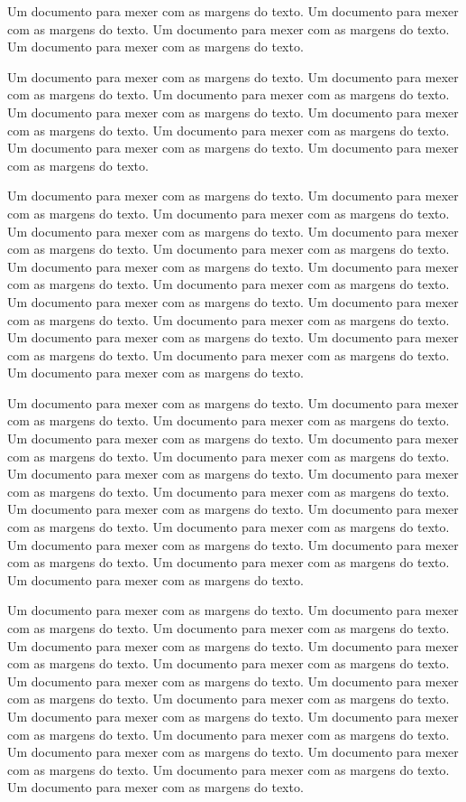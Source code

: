 \documentclass[12pt,article,a4paper,oneside]{memoir}
\begin{document}
\bigskip %

Um documento para mexer com as margens do texto. Um documento para mexer com as margens do texto. Um documento para mexer com as margens do texto. Um documento para mexer com as margens do texto. 

Um documento para mexer com as margens do texto. Um documento para mexer com as margens do texto. Um documento para mexer com as margens do texto. Um documento para mexer com as margens do texto. Um documento para mexer com as margens do texto. Um documento para mexer com as margens do texto. Um documento para mexer com as margens do texto. Um documento para mexer com as margens do texto. 

Um documento para mexer com as margens do texto. Um documento para mexer com as margens do texto. Um documento para mexer com as margens do texto. Um documento para mexer com as margens do texto. Um documento para mexer com as margens do texto. Um documento para mexer com as margens do texto. Um documento para mexer com as margens do texto. Um documento para mexer com as margens do texto. Um documento para mexer com as margens do texto. Um documento para mexer com as margens do texto. Um documento para mexer com as margens do texto. Um documento para mexer com as margens do texto. Um documento para mexer com as margens do texto. Um documento para mexer com as margens do texto. Um documento para mexer com as margens do texto. Um documento para mexer com as margens do texto. 

Um documento para mexer com as margens do texto. Um documento para mexer com as margens do texto. Um documento para mexer com as margens do texto. Um documento para mexer com as margens do texto. Um documento para mexer com as margens do texto. Um documento para mexer com as margens do texto. Um documento para mexer com as margens do texto. Um documento para mexer com as margens do texto. Um documento para mexer com as margens do texto. Um documento para mexer com as margens do texto. Um documento para mexer com as margens do texto. Um documento para mexer com as margens do texto. Um documento para mexer com as margens do texto. Um documento para mexer com as margens do texto. Um documento para mexer com as margens do texto. Um documento para mexer com as margens do texto. 

Um documento para mexer com as margens do texto. Um documento para mexer com as margens do texto. Um documento para mexer com as margens do texto. Um documento para mexer com as margens do texto. Um documento para mexer com as margens do texto. Um documento para mexer com as margens do texto. Um documento para mexer com as margens do texto. Um documento para mexer com as margens do texto. Um documento para mexer com as margens do texto. Um documento para mexer com as margens do texto. Um documento para mexer com as margens do texto. Um documento para mexer com as margens do texto. Um documento para mexer com as margens do texto. Um documento para mexer com as margens do texto. Um documento para mexer com as margens do texto. Um documento para mexer com as margens do texto. 
\end{document}
